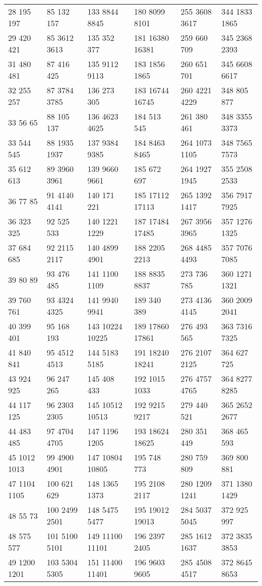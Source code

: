 \begin{center}
\begin{longtable}{llllll}
28 195 197&85 132 157&133 8844 8845&180 8099 8101&255 3608 3617&344 1833 1865\\
29 420 421&85 3612 3613&135 352 377&181 16380 16381&259 660 709&345 2368 2393\\
31 480 481&87 416 425&135 9112 9113&183 1856 1865&260 651 701&345 6608 6617\\
32 255 257&87 3784 3785&136 273 305&183 16744 16745&260 4221 4229&348 805 877\\
33 56 65&88 105 137&136 4623 4625&184 513 545&261 380 461&348 3355 3373\\
33 544 545&88 1935 1937&137 9384 9385&184 8463 8465&264 1073 1105&348 7565 7573\\
35 612 613&89 3960 3961&139 9660 9661&185 672 697&264 1927 1945&355 2508 2533\\
36 77 85&91 4140 4141&140 171 221&185 17112 17113&265 1392 1417&356 7917 7925\\
36 323 325&92 525 533&140 1221 1229&187 17484 17485&267 3956 3965&357 1276 1325\\
37 684 685&92 2115 2117&140 4899 4901&188 2205 2213&268 4485 4493&357 7076 7085\\
39 80 89&93 476 485&141 1100 1109&188 8835 8837&273 736 785&360 1271 1321\\
39 760 761&93 4324 4325&141 9940 9941&189 340 389&273 4136 4145&360 2009 2041\\
40 399 401&95 168 193&143 10224 10225&189 17860 17861&276 493 565&363 7316 7325\\
41 840 841&95 4512 4513&144 5183 5185&191 18240 18241&276 2107 2125&364 627 725\\
43 924 925&96 247 265&145 408 433&192 1015 1033&276 4757 4765&364 8277 8285\\
44 117 125&96 2303 2305&145 10512 10513&192 9215 9217&279 440 521&365 2652 2677\\
44 483 485&97 4704 4705&147 1196 1205&193 18624 18625&280 351 449&368 465 593\\
45 1012 1013&99 4900 4901&147 10804 10805&195 748 773&280 759 809&369 800 881\\
47 1104 1105&100 621 629&148 1365 1373&195 2108 2117&280 1209 1241&371 1380 1429\\
48 55 73&100 2499 2501&148 5475 5477&195 19012 19013&284 5037 5045&372 925 997\\
48 575 577&101 5100 5101&149 11100 11101&196 2397 2405&285 1612 1637&372 3835 3853\\
49 1200 1201&103 5304 5305&151 11400 11401&196 9603 9605&285 4508 4517&372 8645 8653\\

\end{longtable}
\end{center}
